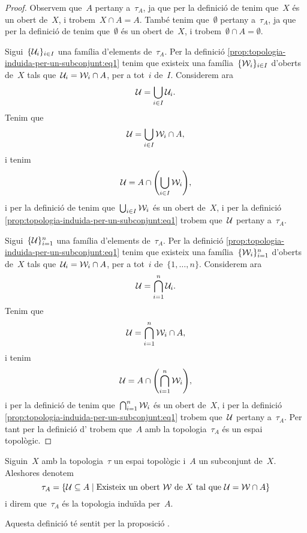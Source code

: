\documentclass[../../main.tex]{subfiles}
\begin{document}
    \begin{proof}
        Observem que~\(A\) pertany a~\(\tau_{A}\), ja que per la definició de  tenim que~\(X\) és un obert de~\(X\), i trobem~\(X\cap A=A\).
        També tenim que~\(\emptyset\) pertany a~\(\tau_{A}\), ja que per la definició de  tenim que~\(\emptyset\) és un obert de~\(X\), i trobem~\(\emptyset\cap A=\emptyset\).

        Sigui~\(\{\mathcal{U}_{i}\}_{i\in I}\) una família d'elements de~\(\tau_{A}\).
        Per la definició \eqref{prop:topologia-induida-per-un-subconjunt:eq1} tenim que existeix una família~\(\{\mathcal{W}_{i}\}_{i\in I}\) d'oberts de~\(X\) tals que~\(\mathcal{U}_{i}=\mathcal{W}_{i}\cap A\), per a tot~\(i\) de~\(I\).
        Considerem ara
        \[
            \mathcal{U}=\bigcup_{i\in I}\mathcal{U}_{i}.
        \]
        Tenim que
        \[
            \mathcal{U}=\bigcup_{i\in I}\mathcal{W}_{i}\cap A,
        \]
        i tenim
        \[
            \obert{U}=A\cap\left(\bigcup_{i\in I}\obert{W}_{i}\right),
        \]
        i per la definició de  tenim que~\(\bigcup_{i\in I}\mathcal{W}_{i}\) és un obert de~\(X\), i per la definició \eqref{prop:topologia-induida-per-un-subconjunt:eq1} trobem que~\(\mathcal{U}\) pertany a~\(\tau_{A}\).

        Sigui~\(\{\mathcal{U}\}_{i=1}^{n}\) una família d'elements de~\(\tau_{A}\).
        Per la definició \eqref{prop:topologia-induida-per-un-subconjunt:eq1} tenim que existeix una família~\(\{\mathcal{W}_{i}\}_{i=1}^{n}\) d'oberts de~\(X\) tals que~\(\mathcal{U}_{i}=\mathcal{W}_{i}\cap A\), per a tot~\(i\) de~\(\{1,\dots,n\}\).
        Considerem ara
        \[
            \mathcal{U}=\bigcap_{i=1}^{n}\mathcal{U}_{i}.
        \]
        Tenim que
        \[
            \mathcal{U}=\bigcap_{i=1}^{n}\mathcal{W}_{i}\cap A,
        \]
        i tenim
        \[
            \obert{U}=A\cap\left(\bigcap_{i=1}^{n}\obert{W}_{i}\right),
        \]
        i per la definició de  tenim que~\(\bigcap_{i=1}^{n}\mathcal{W}_{i}\) és un obert de~\(X\), i per la definició \eqref{prop:topologia-induida-per-un-subconjunt:eq1} trobem que~\(\mathcal{U}\) pertany a~\(\tau_{A}\).
        Per tant per la definició d' trobem que~\(A\) amb la topologia~\(\tau_{A}\) és un espai topològic.
    \end{proof}
    \begin{definition}
        \label{def:topologia-induida-per-un-subconjunt}
        Siguin~\(X\) amb la topologia~\(\tau\) un espai topològic i~\(A\) un subconjunt de~\(X\).
        Aleshores denotem
        \[
            \tau_{A}=\{\mathcal{U}\subseteq A\mid\text{Existeix un obert }\mathcal{W}\text{ de }X\text{ tal que }\mathcal{U}=\mathcal{W}\cap A\}
        \]
        i direm que~\(\tau_{A}\) és la topologia induïda per~\(A\).

        Aquesta definició té sentit per la proposició .
    \end{definition}
\end{document}
